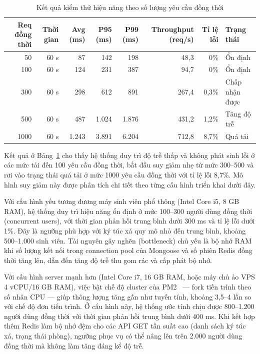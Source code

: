 \documentclass[../DoAn.tex]{subfiles}
\begin{document}
\begin{table}[H]
\centering
\caption{Kết quả kiểm thử hiệu năng theo số lượng yêu cầu đồng thời}
\label{tab:load-test-results}
\footnotesize
\begin{tabular}{|r|r|r|r|r|r|r|l|}
\hline
\textbf{Req đồng thời} & \textbf{Thời gian} & \textbf{Avg (ms)} & \textbf{P95 (ms)} & \textbf{P99 (ms)} & \textbf{Throughput (req/s)} & \textbf{Tỉ lệ lỗi} & \textbf{Trạng thái} \\
\hline
50   & 60 s & 87    & 142   & 198   & 48,3  & 0\%   & Ổn định \\
\hline
100  & 60 s & 124   & 231   & 387   & 94,7  & 0\%   & Ổn định \\
\hline
300  & 60 s & 298   & 612   & 891   & 267,4 & 0,3\% & Chấp nhận được \\
\hline
500  & 60 s & 487   & 1.024 & 1.876 & 431,2 & 1,2\% & Tăng độ trễ \\
\hline
1000 & 60 s & 1.243 & 3.891 & 6.204 & 712,8 & 8,7\% & Quá tải \\
\hline
\end{tabular}
\end{table}

Kết quả ở Bảng~\ref{tab:load-test-results} cho thấy hệ thống duy trì độ trễ thấp
và không phát sinh lỗi ở các mức tải đến 100 yêu cầu đồng thời, bắt đầu suy giảm
nhẹ từ mức 300--500 và rơi vào trạng thái quá tải ở mức 1000 yêu cầu đồng thời
với tỉ lệ lỗi 8,7\%. Mô hình suy giảm này được phân tích chi tiết theo từng cấu
hình triển khai dưới đây.

Với cấu hình yếu tương đương máy sinh viên phổ thông (Intel Core i5, 8 GB RAM),
hệ thống duy trì hiệu năng ổn định ở mức 100--300 người dùng đồng thời (concurrent
users), với thời gian phản hồi trung bình dưới 300 ms và tỉ lệ lỗi dưới 1\%. Đây
là ngưỡng phù hợp với ký túc xá quy mô nhỏ đến trung bình, khoảng 500--1.000 sinh
viên. Tài nguyên gây nghẽn (bottleneck) chủ yếu là bộ nhớ RAM khi số lượng kết nối
trong connection pool của Mongoose và số phiên Redis đồng thời tăng lên, dẫn đến
tăng độ trễ thu gom rác và cấp phát bộ nhớ.

Với cấu hình server mạnh hơn (Intel Core i7, 16 GB RAM, hoặc máy chủ ảo VPS 4
vCPU/16 GB RAM), việc bật chế độ cluster của PM2~\cite{pm2_docs} --- fork tiến
trình theo số nhân CPU --- giúp thông lượng tăng gần như tuyến tính, khoảng
3,5--4 lần so với chế độ đơn tiến trình. Ở cấu hình này, hệ thống ước tính chịu
được 800--1.200 người dùng đồng thời với thời gian phản hồi trung bình dưới 400 ms.
Khi kết hợp thêm Redis làm bộ nhớ đệm cho các API GET tần suất cao (danh sách ký
túc xá, trạng thái phòng), ngưỡng phục vụ có thể nâng lên trên 2.000 người dùng
đồng thời mà không làm tăng đáng kể độ trễ.
\end{document}
